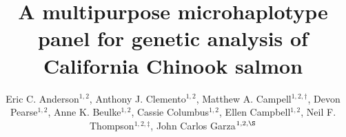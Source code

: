 

\newcommand{\myTitle}{A multipurpose microhaplotype panel for genetic analysis of California Chinook salmon}
\title{\myTitle}

\newcommand{\myAuthors}{Eric C. Anderson$^{1,\S}$, Anthony J. Clemento$^{1,2}$, Matthew A. Campell$^{1,2\dagger}$, Devon Pearse$^{1,2}$, Anne K. Beulke$^{1,2}$, Cassie Columbus$^{1,2}$, Ellen Campbell$^{1,2}$, Neil F. Thompson$^{1,2\ddag}$, John Carlos Garza$^{1,2,\S}$}
\author{Eric C. Anderson$^{1,2}$, Anthony J. Clemento$^{1,2}$, Matthew A. Campell$^{1,2,\dagger}$, Devon Pearse$^{1,2}$, Anne K. Beulke$^{1,2}$, Cassie Columbus$^{1,2}$, Ellen Campbell$^{1,2}$, Neil F. Thompson$^{1,2,\ddag}$, John Carlos Garza$^{1,2,\S}$}


\newcommand{\myAffiliations}{
$^1$Southwest Fisheries Science Center, National Marine Fisheries Service, NOAA, Santa Cruz, California, USA. $^2$Institute for Marine Sciences, University of California, Santa Cruz, USA. $^\dagger$Current address: Centre for Carbon, Water and Food, The University of Sydney, 380 Werombi Road, NSW 2570, Australia. $^\ddag$Current address: Pacific Shellfish Breeding Center, Agricultural Research Service, US Department of Agriculture, Newport, Oregon, USA.
}

\renewcommand{\AuthorAddresses}{\myAffiliations}

\renewcommand{\KeyWords}{Genetic stock identfication, population assignment, parentage based tagging, amplicon sequencing}

\renewcommand{\CorrespondingAuthor}{eric.anderson@noaa.gov,~carlos.garza@noaa.gov}


\newcommand{\myEmailAddress}{eric.anderson@noaa.gov,~carlos.garza@noaa.gov}
\newcommand{\myEmailFootnote}{$^\S$}

\newcommand{\myCopyright}{\copyright US Federal Government work in the public domain in the USA}

\newcommand{\myRunningTitle}{Microhaplotypes for California Chinook salmon}
\renewcommand{\RunningTitle}{\myRunningTitle}

\newcommand{\myRunningAuthor}{Anderson et al.}

